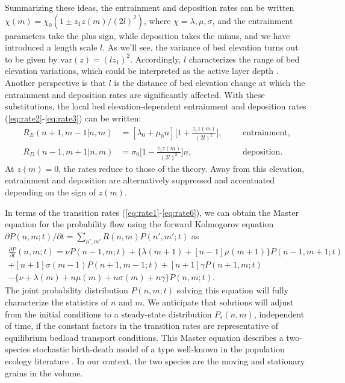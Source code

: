 \documentclass[draft]{agujournal2018}
\begin{document}
Summarizing these ideas, the entrainment and deposition rates can be written $\chi(m) = \chi_0(1\pm z_1 z(m)/(2l)^2)$, where $\chi = \lambda, \mu, \sigma$, and the entrainment parameters take the plus sign, while deposition takes the minus, and we have introduced a length scale $l$.
As we'll see, the variance of bed elevation turns out to be given by $\text{var}(z) = (l z_1)^2$. Accordingly, $l$ characterizes the range of bed elevation variations, which could be interpreted as the active layer depth \citep[e.g.][]{Church2017}.
Another perspective is that $l$ is the distance of bed elevation change at which the entrainment and deposition rates are significantly affected.
With these substitutions, the local bed elevation-dependent entrainment and deposition rates (\ref{eq:rate2}-\ref{eq:rate3}) can be written:
\begin{align}
R_E(n+1,m-1|n,m)&=[\lambda_0 + \mu_0 n]\Big[1 + \frac{z_1z(m)}{(2l)^2}\Big], && &\text{entrainment}, \label{eq:rate5}\\
R_D(n-1,m+1|n,m)&=\sigma_0 \Big[1-\frac{z_1z(m)}{(2l)^2}\Big]n, && &\text{deposition}. \label{eq:rate6}
\end{align}
At $z(m)=0$, the rates reduce to those of the \citet{Ancey2008} theory.
Away from this elevation, entrainment and deposition are alternatively suppressed and accentuated depending on the sign of $z(m)$.


In terms of the transition rates (\ref{eq:rate1}-\ref{eq:rate6}), we can obtain the Master equation for the probability flow using the forward Kolmogorov equation $\partial P(n,m;t)/\partial t = 
\sum_{n',m'} R(n,m)P(n',m';t)$ \citep[e.g.][]{Cox1965, Gillespie1992, Ancey2008} as 
\begin{multline}
 \frac{\partial P}{\partial t}(n,m;t) =  
\nu P(n-1,m;t) + 
\{\lambda(m+1) + [n-1]\mu(m+1)\}P(n-1,m+1;t)\\ + 
[n+1]\sigma(m-1)P(n+1,m-1;t) + 
[n+1]\gamma P(n+1,m;t) \\- 
\{ \nu + \lambda(m) + n\mu(m) + n\sigma(m) + n \gamma \}P(n,m;t).
 \label{eq:master}
\end{multline}
The joint probability distribution $P(n,m;t)$ solving this equation will fully characterize the statistics of $n$ and $m$.
We anticipate that solutions will adjust from the initial conditions to a steady-state distribution $P_s(n,m)$, independent of time, if the constant factors in the transition rates are representative of equilibrium bedload transport conditions.
This Master equation describes a two-species stochastic birth-death model \citep[e.g.][]{Cox1965} of a type well-known in the population ecology literature \citep[e.g.][]{Pielou1977, Swift2002}.
In our context, the two species are the moving and stationary grains in the volume.
\end{document}
